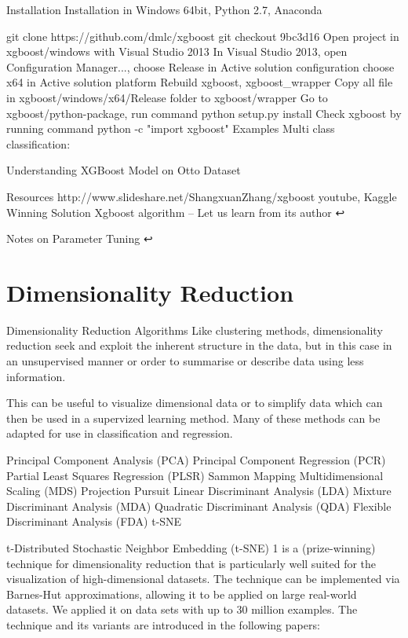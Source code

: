 Installation
Installation in Windows 64bit, Python 2.7, Anaconda

git clone https://github.com/dmlc/xgboost
git checkout 9bc3d16
Open project in xgboost/windows with Visual Studio 2013
In Visual Studio 2013, open Configuration Manager...,
choose Release in Active solution configuration
choose x64 in Active solution platform
Rebuild xgboost, xgboost_wrapper
Copy all file in xgboost/windows/x64/Release folder to xgboost/wrapper
Go to xgboost/python-package, run command python setup.py install
Check xgboost by running command python -c "import xgboost"
Examples
Multi class classification:

Understanding XGBoost Model on Otto Dataset

Resources
http://www.slideshare.net/ShangxuanZhang/xgboost
youtube, Kaggle Winning Solution Xgboost algorithm -- Let us learn from its author ↩

Notes on Parameter Tuning ↩

\section{Dimensionality Reduction}


Dimensionality Reduction Algorithms
Like clustering methods, dimensionality reduction seek and exploit the inherent structure in the data, but in this case in an unsupervised manner or order to summarise or describe data using less information.

This can be useful to visualize dimensional data or to simplify data which can then be used in a supervized learning method. Many of these methods can be adapted for use in classification and regression.

Principal Component Analysis (PCA)
Principal Component Regression (PCR)
Partial Least Squares Regression (PLSR)
Sammon Mapping
Multidimensional Scaling (MDS)
Projection Pursuit
Linear Discriminant Analysis (LDA)
Mixture Discriminant Analysis (MDA)
Quadratic Discriminant Analysis (QDA)
Flexible Discriminant Analysis (FDA)
t-SNE


t-Distributed Stochastic Neighbor Embedding (t-SNE) 1 is a (prize-winning) technique for dimensionality reduction that is particularly well suited for the visualization of high-dimensional datasets. The technique can be implemented via Barnes-Hut approximations, allowing it to be applied on large real-world datasets. We applied it on data sets with up to 30 million examples. The technique and its variants are introduced in the following papers:

